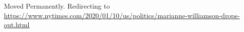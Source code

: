 Moved Permanently. Redirecting to
\url{https://www.nytimes.com/2020/01/10/us/politics/marianne-williamson-drops-out.html}
